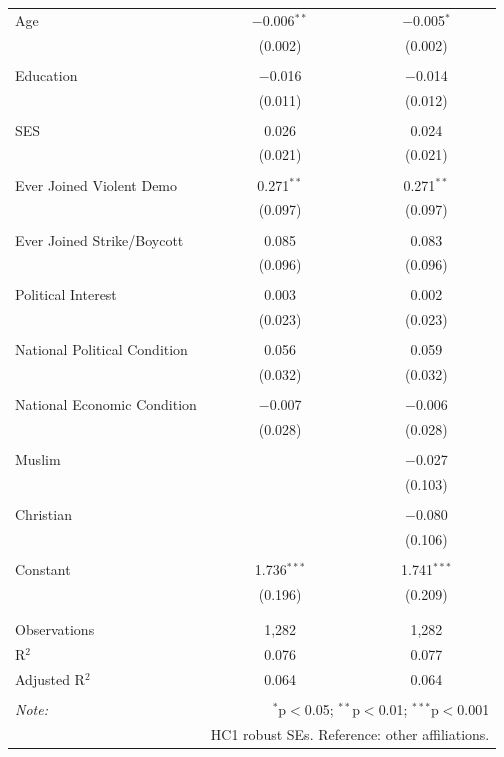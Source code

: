 \begin{table}[!htbp]
\begin{tabular}{@{\extracolsep{5pt}}lcc}
 Age & $-$0.006$^{**}$ & $-$0.005$^{*}$ \\ 
  & (0.002) & (0.002) \\ 
  & & \\ 
 Education & $-$0.016 & $-$0.014 \\ 
  & (0.011) & (0.012) \\ 
  & & \\ 
 SES & 0.026 & 0.024 \\ 
  & (0.021) & (0.021) \\ 
  & & \\ 
 Ever Joined Violent Demo & 0.271$^{**}$ & 0.271$^{**}$ \\ 
  & (0.097) & (0.097) \\ 
  & & \\ 
 Ever Joined Strike/Boycott & 0.085 & 0.083 \\ 
  & (0.096) & (0.096) \\ 
  & & \\ 
 Political Interest & 0.003 & 0.002 \\ 
  & (0.023) & (0.023) \\ 
  & & \\ 
 National Political Condition & 0.056 & 0.059 \\ 
  & (0.032) & (0.032) \\ 
  & & \\ 
 National Economic Condition & $-$0.007 & $-$0.006 \\ 
  & (0.028) & (0.028) \\ 
  & & \\ 
 Muslim &  & $-$0.027 \\ 
  &  & (0.103) \\ 
  & & \\ 
 Christian &  & $-$0.080 \\ 
  &  & (0.106) \\ 
  & & \\ 
 Constant & 1.736$^{***}$ & 1.741$^{***}$ \\ 
  & (0.196) & (0.209) \\ 
  & & \\ 
\hline \\[-1.8ex] 
Observations & 1,282 & 1,282 \\ 
R$^{2}$ & 0.076 & 0.077 \\ 
Adjusted R$^{2}$ & 0.064 & 0.064 \\ 
\hline 
\hline \\[-1.8ex] 
\textit{Note:}  & \multicolumn{2}{r}{$^{*}$p$<$0.05; $^{**}$p$<$0.01; $^{***}$p$<$0.001} \\ 
 & \multicolumn{2}{r}{HC1 robust SEs. Reference: other affiliations.} \\ 
\end{tabular} 
\end{table} 

